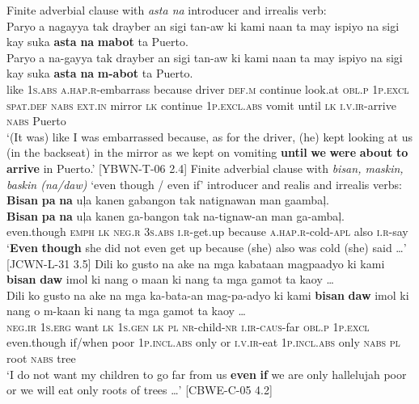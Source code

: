 \z
\ea
Finite adverbial clause with \textit{asta na} introducer and irrealis verb: \\
Paryo  a  nagayya  tak  drayber  an  sigi  tan-aw ki  kami  naan  ta  may  ispiyo  na  sigi  kay  suka \textbf{asta}  \textbf{na}  \textbf{mabot}  ta  Puerto. \smallskip\\
\gll Paryo  a  na-gayya  tak  drayber  an  sigi  tan-aw ki  kami  naan  ta  may  ispiyo  na  sigi  kay  suka \textbf{asta}  \textbf{na}  \textbf{m-abot}  ta  Puerto. \\
like  1\textsc{s.abs}  \textsc{a.hap.r}-embarrass  because  driver  \textsc{def.m}  continue  look.at
\textsc{obl.p}  1\textsc{p.excl}  \textsc{spat.def}  \textsc{nabs}  \textsc{ext.in}  mirror  \textsc{lk}  continue  1\textsc{p.excl.abs}  vomit
until  \textsc{lk}  \textsc{i.v.ir}-arrive  \textsc{nabs}  Puerto \\
\glt `(It was) like I was embarrassed because, as for the driver, (he) kept looking at us (in the backseat) in the mirror as we kept on vomiting \textbf{until} \textbf{we} \textbf{were} \textbf{about} \textbf{to} \textbf{arrive} in Puerto.’ [YBWN-T-06 2.4]
\z
\ea
Finite adverbial clause with \textit{bisan, maskin, baskin (na/daw)} ‘even though / even if’ introducer and realis and irrealis verbs: \\
\textbf{Bisan}  \textbf{pa}  \textbf{na}  uļa  kanen  gabangon  tak  natignawan man  gaambaļ. \smallskip\\
\gll \textbf{Bisan}  \textbf{pa}  \textbf{na}  uļa  kanen  ga-bangon  tak  na-tignaw-an man  ga-ambaļ. \\
even.though  \textsc{emph}  \textsc{lk}  \textsc{neg.r}  3\textsc{s.abs}  \textsc{i.r}-get.up  because  \textsc{a.hap.r}-cold-\textsc{apl}
also  \textsc{i.r}-say \\
\glt `\textbf{Even} \textbf{though} she did not even get up because (she) also was cold (she) said …’ [JCWN-L-31 3.5]
\z
\ea
Dili  ko  gusto  na  ake  na  mga  kabataan  magpaadyo  ki  kami \textbf{bisan}  \textbf{daw}  imol  ki  nang  o  maan  ki  nang ta  mga  gamot  ta  kaoy … \smallskip\\
\gll Dili  ko  gusto  na  ake  na  mga  ka-bata-an  mag-pa-adyo  ki  kami \textbf{bisan}  \textbf{daw}  imol  ki  nang  o  m-kaan  ki  nang ta  mga  gamot  ta  kaoy … \\
\textsc{neg.ir}  1\textsc{s.erg}  want  \textsc{lk}  1\textsc{s.gen}  \textsc{lk}  \textsc{pl}  \textsc{nr}-child-\textsc{nr}  \textsc{i.ir}-\textsc{caus}-far  \textsc{obl.p}  1\textsc{p.excl}
even.though  if/when  poor  1\textsc{p.incl.abs}  only  or  \textsc{i.v.ir}-eat  1\textsc{p.incl.abs}  only
\textsc{nabs}  \textsc{pl}  root  \textsc{nabs}  tree \\
\glt `I do not want my children to go far from us \textbf{even} \textbf{if} we are only hallelujah poor or we will eat only roots of trees …’ [CBWE-C-05 4.2]
\z

